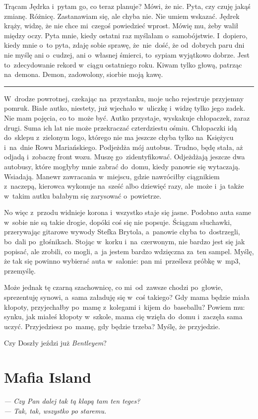 \documentclass[9pt, a5paper]{memoir}
\begin{document}
Trącam Jędrka i~pytam go, co teraz planuje? Mówi, że nic. Pyta, czy czuję jakąś zmianę. Różnicę. Zastanawiam się, ale chyba nie. Nie umiem wskazać. Jędrek krąży, widzę, że nie chce mi~czegoś powiedzieć wprost. Mówię mu, żeby walił między oczy. Pyta mnie, kiedy ostatni raz myślałam o~samobójstwie. I~dopiero, kiedy mnie o~to pyta, zdaję sobie sprawę, że~nie~dość, że od~dobrych paru dni nie myślę ani o~cudzej, ani o~własnej śmierci, to~sypiam wyjątkowo dobrze. Jest to~zdecydowanie rekord w~ciągu ostatniego roku. Kiwam tylko głową, patrząc na~demona. Demon, zadowolony, siorbie moją kawę.

\fancybreak{* \quad * \quad *}

W~drodze powrotnej, czekając na~przystanku, moje ucho rejestruje przyjemny pomruk. Białe autko, niestety, już wjechało w~uliczkę i~widzę tylko jego zadek. Nie mam pojęcia, co to~może być. Autko przystaje, wyskakuje chłopaczek, zaraz drugi. Suma ich lat nie może przekraczać czterdziestu ośmiu. Chłopaczki idą do~sklepu z~zielonym logo, którego nie ma jeszcze chyba tylko na~Księżycu i~na~dnie Rowu Mariańskiego. Podjeżdża mój autobus. Trudno, będę stała, aż odjadą i~zobaczę front wozu. Muszę go~zidentyfikować. Odjeżdżają jeszcze dwa autobusy, które mogłyby mnie zabrać do~domu, kiedy panowie się wytaczają. Wsiadają. Manewr zawracania w~miejscu, gdzie nawróciłby ciągnikiem z~naczepą, kierowca wykonuje na~sześć albo dziewięć razy, ale~może i~ja także w~takim autku bałabym się zarysować o~powietrze.

No więc z~przodu widnieje korona i~wszystko staje się jasne. Podobno auta same w~sobie nie są takie drogie, dopóki coś się nie popsuje. Ściągam słuchawki, przerywając gitarowe wywody Stefka Brytola, a~panowie chyba to~dostrzegli, bo~dali po~głośnikach. Stojąc w~korku i~na~czerwonym, nie bardzo jest się jak popisać, ale zrobili, co mogli, a~ja jestem bardzo wdzięczna za~ten sampel. Myślę, że tak się powinno wybierać auta w~salonie: pan mi~prześlesz próbkę w~mp3, przemyślę.

Może jednak tę czarną szachownicę, co mi~od~zawsze chodzi po~głowie, sprezentuję synowi, a~sama załaduję się w~coś takiego? Gdy mama będzie miała kłopoty, przyjechałby po~mamę z~kolegami i~kijem do~baseballu? Powiem mu: synku, jak miałeś kłopoty w~szkole, mama cię wzięła do~domu i~zaczęła sama uczyć. Przyjedziesz po~mamę, gdy będzie trzeba? Myślę, że przyjedzie.

Czy Doszły jeździ już \textit{Bentleyem}?

\newpage
\section{Mafia Island}
{
\itshape
--- Czy Pan dalej tak tą klapą tam ten teges?\\
--- Tak, tak, wszystko po staremu.
}
\end{document}
